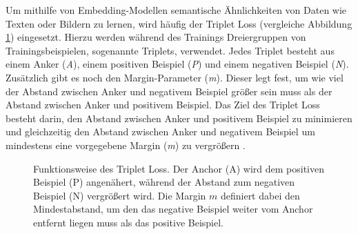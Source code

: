 Um mithilfe von Embedding-Modellen semantische Ähnlichkeiten von Daten wie Texten oder Bildern zu lernen, wird häufig der Triplet Loss (vergleiche Abbildung \ref{fig:triplet_loss}) eingesetzt.
Hierzu werden während des Trainings Dreiergruppen von Trainingsbeispielen, sogenannte Triplets, verwendet. 
Jedes Triplet besteht aus einem Anker (\textit{A}), einem positiven Beispiel (\textit{P}) und einem negativen Beispiel (\textit{N}).
Zusätzlich gibt es noch den Margin-Parameter (\textit{m}). Dieser legt fest, um wie viel der Abstand zwischen Anker und negativem Beispiel größer sein muss als der Abstand zwischen Anker und positivem Beispiel. 
Das Ziel des Triplet Loss besteht darin, 
den Abstand zwischen Anker und positivem Beispiel zu minimieren und gleichzeitig den Abstand zwischen Anker und negativem Beispiel um mindestens eine vorgegebene Margin (\textit{m}) zu vergrößern \parencite{Schroff2015}.


\begin{figure}[H] 
  \centering 
  \caption{ Funktionsweise des Triplet Loss. Der Anchor (A) wird dem positiven Beispiel (P) angenähert, während der Abstand zum negativen Beispiel (N) vergrößert wird. Die Margin $m$ definiert dabei den Mindestabstand, um den das negative Beispiel weiter vom Anchor entfernt liegen muss als das positive Beispiel. } 
  \label{fig:triplet_loss} 
\end{figure}



